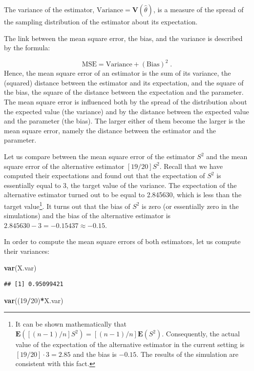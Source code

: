 \documentclass[]{krantz}
\makeatletter
\newenvironment{Shaded}{\begin{snugshade}}{\end{snugshade}}
\newcommand{\DecValTok}[1]{\textcolor[rgb]{0.00,0.00,0.81}{#1}}
\newcommand{\KeywordTok}[1]{\textcolor[rgb]{0.13,0.29,0.53}{\textbf{#1}}}
\newcommand{\NormalTok}[1]{#1}
\newcommand{\OperatorTok}[1]{\textcolor[rgb]{0.81,0.36,0.00}{\textbf{#1}}}
\newcommand{\Expec}{\mathbf{E}}
\newcommand{\Var}{\mathbf{V}}
\newenvironment{kframe}{%
\medskip{}
\setlength{\fboxsep}{.8em}
 \def\at@end@of@kframe{}%
 \ifinner\ifhmode%
  \def\at@end@of@kframe{\end{minipage}}%
  \begin{minipage}{\columnwidth}%
 \fi\fi%
 \def\FrameCommand##1{\hskip\@totalleftmargin \hskip-\fboxsep
 \colorbox{shadecolor}{##1}\hskip-\fboxsep
     \hskip-\linewidth \hskip-\@totalleftmargin \hskip\columnwidth}%
 \MakeFramed {\advance\hsize-\width
   \@totalleftmargin\z@ \linewidth\hsize
   \@setminipage}}%
 {\par\unskip\endMakeFramed%
 \at@end@of@kframe}
\renewenvironment{Shaded}{\begin{kframe}}{\end{kframe}}
\theoremstyle{definition}
\theoremstyle{definition}
\theoremstyle{definition}
\theoremstyle{remark}
\makeatother
\begin{document}
The variance of the estimator, \(\mbox{Variance} = \Var(\hat \theta)\), is
a measure of the spread of the sampling distribution of the estimator
about its expectation.

The link between the mean square error, the bias, and the variance is
described by the formula:

\[\mbox{MSE} = \mbox{Variance} + (\mbox{Bias})^2\;.\] Hence, the mean
square error of an estimator is the sum of its variance, the (squared)
distance between the estimator and its expectation, and the square of
the bias, the square of the distance between the expectation and the
parameter. The mean square error is influenced both by the spread of the
distribution about the expected value (the variance) and by the distance
between the expected value and the parameter (the bias). The larger
either of them become the larger is the mean square error, namely the
distance between the estimator and the parameter.

Let us compare between the mean square error of the estimator \(S^2\) and
the mean square error of the alternative estimator \([19/20] S^2\). Recall
that we have computed their expectations and found out that the
expectation of \(S^2\) is essentially equal to 3, the target value of the
variance. The expectation of the alternative estimator turned out to be
equal to 2.845630, which is less than the target value\footnote{It can be shown mathematically that
  \(\Expec([(n-1)/n] S^2) = [(n-1)/n] \Expec(S^2)\). Consequently, the
  actual value of the expectation of the alternative estimator in the
  current setting is \([19/20]\cdot 3 = 2.85\) and the bias is \(-0.15\).
  The results of the simulation are consistent with this fact.}. It turns
out that the bias of \(S^2\) is zero (or essentially zero in the
simulations) and the bias of the alternative estimator is
\(2.845630 - 3 = -0.15437 \approx -0.15\).

In order to compute the mean square errors of both estimators, let us
compute their variances:

\begin{Shaded}
\begin{Highlighting}[]
\KeywordTok{var}\NormalTok{(X.var)}
\end{Highlighting}
\end{Shaded}

\begin{verbatim}
## [1] 0.95099421
\end{verbatim}

\begin{Shaded}
\begin{Highlighting}[]
\KeywordTok{var}\NormalTok{((}\DecValTok{19}\OperatorTok{/}\DecValTok{20}\NormalTok{)}\OperatorTok{*}\NormalTok{X.var)}
\end{Highlighting}
\end{Shaded}
\end{document}
